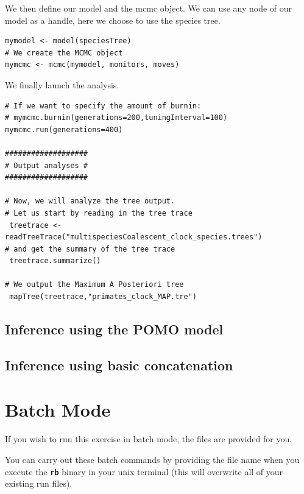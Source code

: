 \documentclass[11pt]{article}
\newcommand{\cl}[1]{{\texttt{\textbf{#1}}}}
\begin{document}
{\begin{framed}
We then define our model and the mcmc object. We can use any node of our model as a handle, here we choose to use the species tree.
{\tt \begin{snugshade*}
\begin{lstlisting}
mymodel <- model(speciesTree)
# We create the MCMC object
mymcmc <- mcmc(mymodel, monitors, moves)
\end{lstlisting}
\end{snugshade*}}

We finally launch the analysis.
{\tt \begin{snugshade*}
\begin{lstlisting}
# If we want to specify the amount of burnin:
# mymcmc.burnin(generations=200,tuningInterval=100)
mymcmc.run(generations=400)

###################
# Output analyses #
###################

# Now, we will analyze the tree output.
# Let us start by reading in the tree trace
 treetrace <- readTreeTrace("multispeciesCoalescent_clock_species.trees")
# and get the summary of the tree trace
 treetrace.summarize()

# We output the Maximum A Posteriori tree
 mapTree(treetrace,"primates_clock_MAP.tre")

\end{lstlisting}
\end{snugshade*}}
\end{framed}}








\subsection*{Inference using the POMO model }


\subsection*{Inference using basic concatenation }

\bigskip
\section*{Batch Mode}

If you wish to run this exercise in batch mode, the files are provided for you. 

You can carry out these batch commands by providing the file name when you execute the \cl{rb} binary in your unix terminal (this will overwrite all of your existing run files).
\exs{\cl{\$ rb full\_analysis.Rev}}
\end{document}

